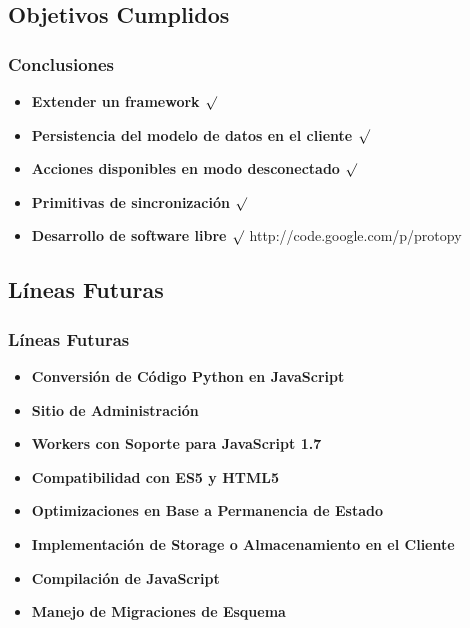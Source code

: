 \documentclass{beamer}
\begin{document}
\subsection{Objetivos Cumplidos}
\begin{frame}
    \frametitle{Conclusiones}
    \begin{itemize}
        \item {\bf Extender un framework $\surd$}
        \item {\bf Persistencia del modelo de datos en el cliente $\surd$}
        \item {\bf Acciones disponibles en modo desconectado $\surd$}
        \item {\bf Primitivas de sincronización $\surd$}
        \item {\bf Desarrollo de software libre $\surd$}
        http://code.google.com/p/protopy
    \end{itemize}
\end{frame}

\subsection{Líneas Futuras}
\begin{frame}
    \frametitle{Líneas Futuras}
    \begin{itemize}
        \item{\bf Conversión de Código Python en JavaScript}
        \item{\bf Sitio de Administración}
        \item{\bf Workers con Soporte para JavaScript 1.7}
        \item{\bf Compatibilidad con ES5 y HTML5}
        \item{\bf Optimizaciones en Base a Permanencia de Estado}
        \item{\bf Implementación de Storage o Almacenamiento en el Cliente}
        \item{\bf Compilación de JavaScript}
        \item {\bf Manejo de Migraciones de Esquema}
    \end{itemize}
\end{frame}
\end{document}
